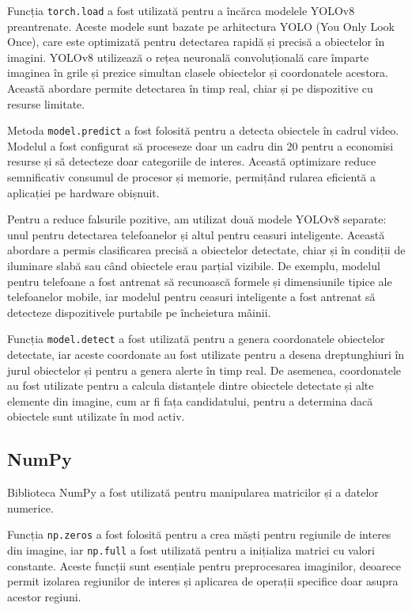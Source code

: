 \documentclass[12pt,a4paper]{article}
\begin{document}
Funcția \texttt{torch.load} a fost utilizată pentru a încărca modelele YOLOv8 preantrenate. Aceste modele sunt bazate pe arhitectura YOLO (You Only Look Once), care este optimizată pentru detectarea rapidă și precisă a obiectelor în imagini\cite{academic3}. YOLOv8 utilizează o rețea neuronală convoluțională care împarte imaginea în grile și prezice simultan clasele obiectelor și coordonatele acestora. Această abordare permite detectarea în timp real, chiar și pe dispozitive cu resurse limitate.

Metoda \texttt{model.predict} a fost folosită pentru a detecta obiectele în cadrul video. Modelul a fost configurat să proceseze doar un cadru din 20 pentru a economisi resurse și să detecteze doar categoriile de interes. Această optimizare reduce semnificativ consumul de procesor și memorie, permițând rularea eficientă a aplicației pe hardware obișnuit.

Pentru a reduce falsurile pozitive, am utilizat două modele YOLOv8 separate: unul pentru detectarea telefoanelor și altul pentru ceasuri inteligente. Această abordare a permis clasificarea precisă a obiectelor detectate, chiar și în condiții de iluminare slabă sau când obiectele erau parțial vizibile. De exemplu, modelul pentru telefoane a fost antrenat să recunoască formele și dimensiunile tipice ale telefoanelor mobile, iar modelul pentru ceasuri inteligente a fost antrenat să detecteze dispozitivele purtabile pe încheietura mâinii.

Funcția \texttt{model.detect} a fost utilizată pentru a genera coordonatele obiectelor detectate, iar aceste coordonate au fost utilizate pentru a desena dreptunghiuri în jurul obiectelor și pentru a genera alerte în timp real. De asemenea, coordonatele au fost utilizate pentru a calcula distanțele dintre obiectele detectate și alte elemente din imagine, cum ar fi fața candidatului, pentru a determina dacă obiectele sunt utilizate în mod activ.

\subsection{NumPy}
Biblioteca NumPy a fost utilizată pentru manipularea matricilor și a datelor numerice\cite{numpy}. 

Funcția \texttt{np.zeros} a fost folosită pentru a crea măști pentru regiunile de interes din imagine, iar \texttt{np.full} a fost utilizată pentru a inițializa matrici cu valori constante. Aceste funcții sunt esențiale pentru preprocesarea imaginilor, deoarece permit izolarea regiunilor de interes și aplicarea de operații specifice doar asupra acestor regiuni\cite{academic3}.
\end{document}
